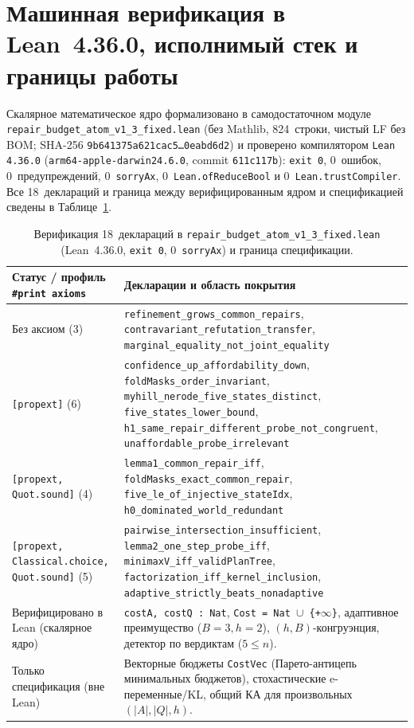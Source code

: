\documentclass[11pt,a4paper]{article}
\theoremstyle{preprintthm}
\theoremstyle{preprintdef}
\begin{document}
\section{Машинная верификация в Lean~4.36.0, исполнимый стек и границы работы}

Скалярное математическое ядро формализовано в самодостаточном модуле \texttt{repair\_\allowbreak budget\_\allowbreak atom\_\allowbreak v1\_3\_fixed.lean} (без Mathlib, 824~строки, чистый LF без BOM; SHA-256 \texttt{9b641375a621cac5\ldots0eabd6d2}) и проверено компилятором \texttt{Lean 4.36.0} (\texttt{arm64-apple-darwin24.6.0}, commit \texttt{611c117b}): \texttt{exit 0}, 0~ошибок, 0~предупреждений, 0~\texttt{sorryAx}, 0~\texttt{Lean.ofReduceBool} и 0~\texttt{Lean.trustCompiler}. Все 18~деклараций и граница между верифицированным ядром и спецификацией сведены в Таблице~\ref{tab:lean}.

\begin{table}[!htbp]
\centering
\caption{Верификация 18~деклараций в \texttt{repair\_budget\_atom\_v1\_3\_fixed.lean} (Lean~4.36.0, \texttt{exit 0}, 0~\texttt{sorryAx}) и граница спецификации.}
\label{tab:lean}
\footnotesize
\begin{tabularx}{\linewidth}{@{}l >{\raggedright\arraybackslash}X@{}}
\toprule
\textbf{Статус / профиль \texttt{\#print axioms}} & \textbf{Декларации и область покрытия} \\
\midrule
Без аксиом (3) & \texttt{refinement\_grows\_common\_repairs}, \texttt{contravariant\_refutation\_transfer}, \texttt{marginal\_equality\_not\_joint\_equality} \\
\texttt{[propext]} (6) & \texttt{confidence\_up\_affordability\_down}, \texttt{foldMasks\_order\_invariant}, \texttt{myhill\_nerode\_five\_states\_distinct}, \texttt{five\_states\_lower\_bound}, \texttt{h1\_\allowbreak same\_\allowbreak repair\_\allowbreak different\_\allowbreak probe\_\allowbreak not\_\allowbreak congruent}, \texttt{unaffordable\_probe\_irrelevant} \\
\texttt{[propext, Quot.sound]} (4) & \texttt{lemma1\_common\_repair\_iff}, \texttt{foldMasks\_exact\_common\_repair}, \texttt{five\_le\_of\_injective\_stateIdx}, \texttt{h0\_dominated\_world\_redundant} \\
\texttt{[propext, Classical.choice, Quot.sound]} (5) & \texttt{pairwise\_intersection\_insufficient}, \texttt{lemma2\_one\_step\_probe\_iff}, \texttt{minimaxV\_iff\_validPlanTree}, \texttt{factorization\_iff\_kernel\_inclusion}, \texttt{adaptive\_\allowbreak strictly\_\allowbreak beats\_\allowbreak nonadaptive} \\
\midrule
Верифицировано в Lean (скалярное ядро) & \texttt{costA, costQ : Nat}, \texttt{Cost = Nat $\cup$ \{+$\infty$\}}, адаптивное преимущество ($B=3,h=2$), $(h,B)$-конгруэнция, детектор по вердиктам ($5\le n$). \\
Только спецификация (вне Lean) & Векторные бюджеты \texttt{CostVec} (Парето-антицепь минимальных бюджетов), стохастические e-переменные/KL, общий КА для произвольных $(|A|,|Q|,h)$. \\
\bottomrule
\end{tabularx}
\end{table}
\end{document}
